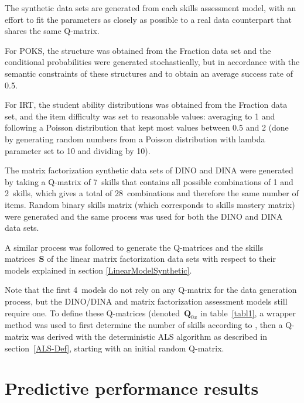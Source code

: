 The synthetic data sets are generated from each skills assessment model, with an effort to fit the parameters as closely as possible to a real data counterpart that shares the same Q-matrix.  

For POKS, the structure was obtained from the Fraction data set and the conditional probabilities were generated stochastically, but in accordance with the semantic constraints of these structures and to obtain an average success rate of 0.5.

For IRT, the student ability distributions was obtained from the Fraction data set, and the item difficulty was set to reasonable values: averaging to 1 and following a Poisson distribution that kept most values between 0.5 and 2 (done by generating random numbers from a Poisson distribution with lambda parameter set to 10 and dividing by 10). 

The matrix factorization synthetic data sets of DINO and DINA were generated by taking a Q-matrix of 7~skills that contains all possible combinations of 1 and 2~skills, which gives a total of 28~combinations and therefore the same number of items.  Random binary skills matrix (which corresponds to skills mastery matrix) were generated and the same process was used for both the DINO and DINA data sets.

A similar process was followed to generate the Q-matrices and the skills matrices~$\mathbf{S}$ of the linear matrix factorization data sets with respect to their models explained in section \ref{LinearModelSynthetic}.


Note that the first 4~models do not rely on any Q-matrix for the data generation process, but the DINO/DINA and matrix factorization assessment models still require one.  To define these Q-matrices (denoted~$\mathbf{Q}_{0x}$ in table~\ref{tabl1}, a wrapper method was used to first determine the number of skills according to \citep{Beheshti2012Numbers}, then a Q-matrix was derived with the deterministic ALS algorithm as described in section~\ref{ALS-Def}, starting with an initial random Q-matrix.



\section{Predictive performance results} \label{secSyn}

